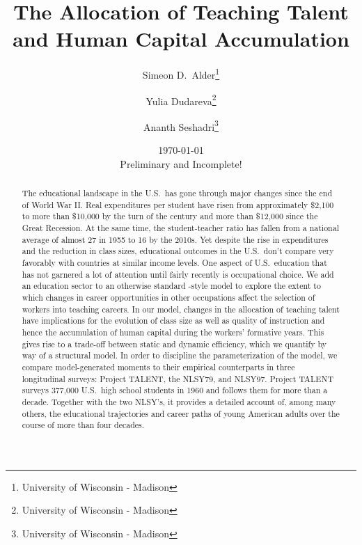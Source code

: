\documentclass[onehalfspacing,11pt]{article}
\begin{document}
\begin{titlepage}
\title{The Allocation of Teaching Talent and Human Capital Accumulation}
\author{Simeon D.~Alder\footnote{University of Wisconsin - Madison} \and Yulia Dudareva\footnote{University of Wisconsin - Madison} \and Ananth Seshadri\footnote{University of Wisconsin - Madison}}
\date{\today \\ \vspace{5mm} {\sc Preliminary and Incomplete!}}

\maketitle

\begin{abstract}
The educational landscape in the U.S.~has gone through major changes since the end of World War II. Real expenditures per student have risen from approximately \$2,100 to more than \$10,000 by the turn of the century and more than \$12,000 since the Great Recession. At the same time, the student-teacher ratio has fallen from a national average of almost 27 in 1955 to 16 by the 2010s. Yet despite the rise in expenditures and the reduction in class sizes, educational outcomes in the U.S.~don't compare very favorably with countries at similar income levels. One aspect of U.S.~education that has not garnered a lot of attention until fairly recently is occupational choice. We add an education sector to an otherwise standard \cite{Hsieh:2018}-style model to explore the extent to which changes in career opportunities in other occupations affect the selection of workers into teaching careers. In our model, changes in the allocation of teaching talent have implications for the evolution of class size as well as quality of instruction and hence the accumulation of human capital during the workers' formative years. This gives rise to a trade-off between static and dynamic efficiency, which we quantify by way of a structural model. In order to discipline the parameterization of the model, we compare model-generated moments to their empirical counterparts in three longitudinal surveys: Project TALENT, the NLSY79, and NLSY97. Project TALENT surveys 377,000 U.S.~high school students in 1960 and follows them for more than a decade. Together with the two NLSY's, it provides a detailed account of, among many others, the educational trajectories and career paths of young American adults over the course of more than four decades.
\end{abstract}
\end{titlepage}
\end{document}
